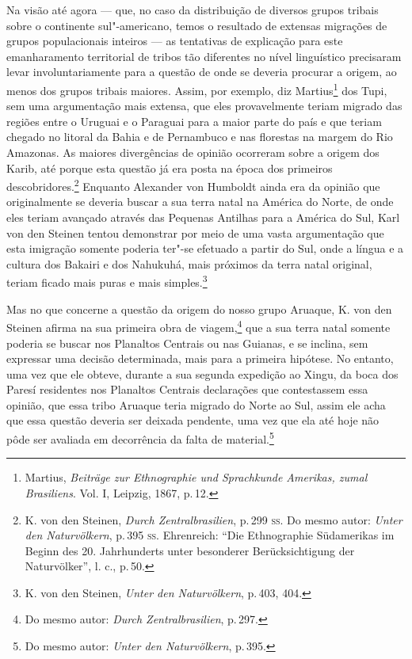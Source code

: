 Na visão até agora --- que, no caso da distribuição de diversos grupos
tribais sobre o continente sul"-americano, temos o resultado de extensas
migrações de grupos populacionais inteiros --- as tentativas de
explicação para este emanharamento territorial de tribos tão diferentes 
no nível linguístico precisaram levar involuntariamente para
a questão de onde se deveria procurar a origem, ao menos dos grupos
tribais maiores. Assim, por exemplo, diz Martius\footnote{Martius,
  \textit{Beiträge zur Ethnographie und Sprachkunde Amerikas, zumal
  Brasiliens}. Vol. I, Leipzig, 1867, p.\,12.} dos Tupi, sem uma
argumentação mais extensa, que eles provavelmente teriam migrado das regiões
entre o Uruguai e o Paraguai para a maior parte do país e que teriam chegado
no litoral da Bahia e de Pernambuco e nas florestas na margem do Rio
Amazonas. As maiores divergências de opinião ocorreram sobre a origem
dos Karib, até porque esta questão já era posta na época dos primeiros
descobridores.\footnote{K. von den Steinen, \textit{Durch
  Zentralbrasilien}, p.\,299 \textsc{ss}. Do mesmo autor: \textit{Unter den
  Naturvölkern}, p.\,395 \textsc{ss}. Ehrenreich: ``Die Ethnographie Südamerikas
  im Beginn des 20. Jahrhunderts unter besonderer Berücksichtigung der
  Naturvölker'', l. c., p.\,50.} Enquanto Alexander von Humboldt ainda
era da opinião que originalmente se deveria buscar a sua terra natal na
América do Norte, de onde eles teriam avançado através das Pequenas
Antilhas para a América do Sul, Karl von den Steinen tentou demonstrar
por meio de uma vasta argumentação que esta imigração somente poderia
ter"-se efetuado a partir do Sul, onde a língua e a cultura dos Bakairi e
dos Nahukuhá, mais próximos da terra natal original, teriam ficado
mais puras e mais simples.\footnote{K. von den Steinen, \textit{Unter den
  Naturvölkern}, p.\,403, 404.}

Mas no que concerne a questão da origem do nosso grupo Aruaque, K. von
den Steinen afirma na sua primeira obra de viagem,\footnote{Do mesmo
  autor: \textit{Durch Zentralbrasilien}, p.\,297.} que a sua terra natal
somente poderia se buscar nos Planaltos Centrais ou nas Guianas, e se
inclina, sem expressar uma decisão determinada, mais para a primeira
hipótese. No entanto, uma vez que ele obteve, durante a sua segunda
expedição ao Xingu, da boca dos Paresí residentes nos Planaltos
Centrais declarações que contestassem essa opinião, que essa tribo
Aruaque teria migrado do Norte ao Sul, assim ele acha que essa questão
deveria ser deixada pendente, uma vez que ela até hoje não pôde ser
avaliada em decorrência da falta de material.\footnote{Do mesmo autor:
  \textit{Unter den Naturvölkern}, p.\,395.}


